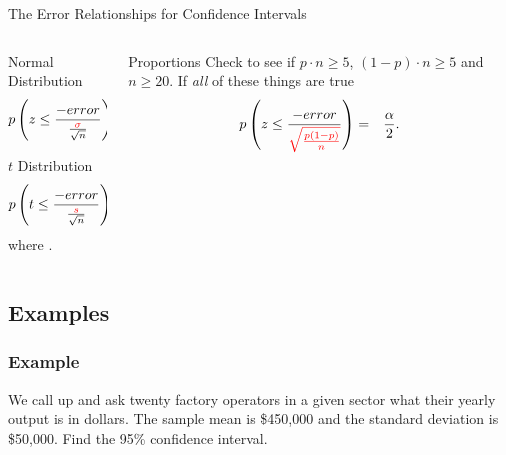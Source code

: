 \begin{frame}{The Error Relationships for Confidence Intervals}

  \begin{columns}[T]

    \begin{column}[T]{0.5\textwidth}
      \begin{block}{\color{blue}Normal Distribution}
        \begin{eqnarray*}
          p\left( z \leq \frac{-error}{\frac{{\color{red}\sigma}}{\sqrt{n}}}\right) & = & \frac{\alpha}{2}.
        \end{eqnarray*}
      \end{block}

      \begin{block}{\color{blue}$t$ Distribution}
        \begin{eqnarray*}
          p\left( t \leq \frac{-error}{\frac{{\color{red}s}}{\sqrt{n}}}\right) & = & \frac{\alpha}{2},
        \end{eqnarray*}
        where .
      \end{block}
    \end{column}


    \begin{column}[T]{0.5\textwidth}
      \begin{block}{\color{blue}Proportions}
        Check to see if $p\cdot n \geq 5$, $(1-p)\cdot n \geq 5$ and
        $n\geq 20$. If \textit{all} of these things are true
        \begin{eqnarray*}
          p\left( z \leq \frac{-error}{{\color{red}\sqrt{\frac{p(1-p)}{n}}}} \right) & = & \frac{\alpha}{2}.
        \end{eqnarray*}
      \end{block}
    \end{column}
  \end{columns}
  
\end{frame}



\subsection{Examples}


\begin{frame}
  \frametitle{Example}

  We call up and ask twenty factory operators in a given sector what
  their yearly output is in dollars. The sample mean is \$450,000 and
  the  standard deviation is
  \$50,000. Find the 95\% confidence interval.

  \vfill


  \vfill

\end{frame}


